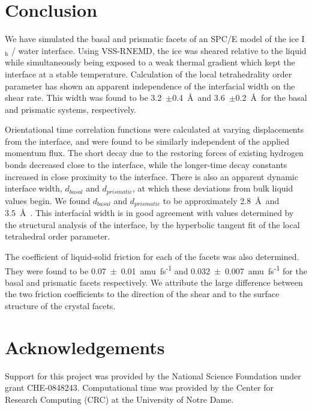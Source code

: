 \documentclass[11pt]{article}
\begin{document}
\begin{doublespace}
\section{Conclusion}
We have simulated the basal and prismatic facets of an SPC/E model of
the ice I$_\mathrm{h}$ / water interface.  Using VSS-RNEMD, the ice
was sheared relative to the liquid while simultaneously being exposed
to a weak thermal gradient which kept the interface at a stable
temperature.  Calculation of the local tetrahedrality order parameter
has shown an apparent independence of the interfacial width on the
shear rate.  This width was found to be 3.2~$\pm$0.4~\AA\ and
3.6~$\pm$0.2~\AA\ for the basal and prismatic systems, respectively.

Orientational time correlation functions were calculated at varying
displacements from the interface, and were found to be similarly
independent of the applied momentum flux. The short decay due to the
restoring forces of existing hydrogen bonds decreased close to the
interface, while the longer-time decay constants increased in close
proximity to the interface.  There is also an apparent dynamic
interface width, $d_{basal}$ and $d_{prismatic}$, at which these
deviations from bulk liquid values begin.  We found $d_{basal}$ and
$d_{prismatic}$ to be approximately 2.8~\AA\ and 3.5~\AA\ . This
interfacial width is in good agreement with values determined by the
structural analysis of the interface, by the hyperbolic tangent fit of
the local tetrahedral order parameter.

The coefficient of liquid-solid friction for each of the facets was
also determined. They were found to be
0.07~$\pm$~0.01~amu~fs\textsuperscript{-1} and
0.032~$\pm$~0.007~amu~fs\textsuperscript{-1} for the basal and
prismatic facets respectively. We attribute the large difference
between the two friction coefficients to the direction of the shear
and to the surface structure of the crystal facets.

\section{Acknowledgements}
  Support for this project was provided by the National Science
  Foundation under grant CHE-0848243. Computational time was provided
  by the Center for Research Computing (CRC) at the University of
  Notre Dame.

\newpage


\end{doublespace}
\end{document}
